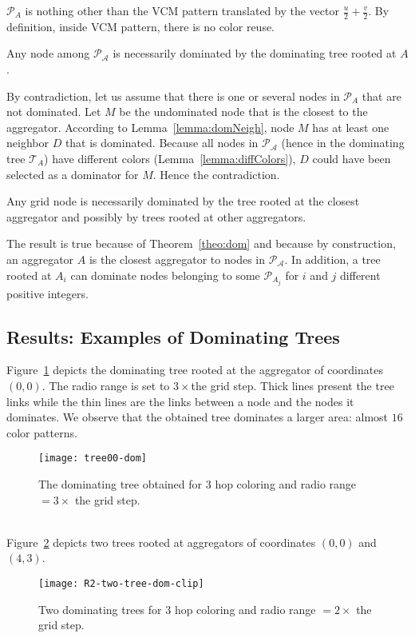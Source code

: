 \proof
$\mathcal{P}_{A}$ is nothing other than the VCM pattern translated by the vector $\frac{u}{2}+\frac{v}{2}$. By definition, inside VCM pattern, there is no color reuse.
\endproof

\begin{theorem}\label{theo:dom}
Any node among $\mathcal{P_A}$ is necessarily dominated by the dominating tree rooted at $A$.
\end{theorem}

\proof
By contradiction, let us assume that there is one or several nodes in $\mathcal{P}_{A}$ that are not dominated. Let $M$ be the undominated node that is the closest to the aggregator. 
According to Lemma~\ref{lemma:domNeigh}, node $M$ has at least one neighbor $D$ that is dominated. Because all nodes in $\mathcal {P_A}$ (hence in the dominating tree $\mathcal{T}_{A}$) have different colors (Lemma~\ref{lemma:diffColors}), $D$ could have been selected as a dominator for $M$. Hence the contradiction. \endproof

\begin{corollary}\label{coro:closest}
Any grid node is necessarily dominated by the tree rooted at the closest aggregator and possibly by trees rooted at other aggregators. 
\end{corollary}
\proof
The result is true because of Theorem~\ref{theo:dom} and because by construction, an aggregator $A$ is the closest aggregator to nodes in $\mathcal{P_A}$. In addition, a tree    
rooted at $A_i$ can dominate nodes belonging to some $\mathcal{P}_{A_j}$ for $i$ and $j$ different positive integers.
\endproof

\subsection{Results: Examples of Dominating Trees}
Figure~\ref{fig:tree} depicts the dominating tree rooted at the aggregator of coordinates $(0,0)$. The radio range is set to $3\times $the grid step. Thick lines present the tree links while the thin lines are the links between a node and the nodes it dominates. We observe that the obtained tree dominates a larger area: almost $16$ color patterns.
\begin{figure}[!h]
\centering
\texttt{[image: tree00-dom]}
\caption{The dominating tree obtained for $3$ hop coloring and radio range $=3 \times$ the grid step.\label{fig:tree}}
\end{figure}
~~ \\
Figure~\ref{fig:twoTrees} depicts two trees rooted at aggregators of coordinates $(0,0)$ and $(4,3)$. \begin{figure}[!h]
\centering
{\texttt{[image: R2-two-tree-dom-clip]}}\caption{Two dominating trees for $3$ hop coloring and radio range $=2 \times$ the grid step.\label{fig:twoTrees}}
\end{figure}

